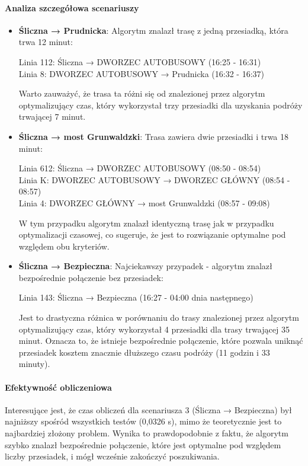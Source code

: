 \documentclass[12pt,a4paper]{article}
\begin{document}
\paragraph{Analiza szczegółowa scenariuszy}

\begin{itemize}
    \item \textbf{Śliczna → Prudnicka}: Algorytm znalazł trasę z jedną przesiadką, która trwa 12 minut:
    \begin{center}
    Linia 112: Śliczna → DWORZEC AUTOBUSOWY (16:25 - 16:31) \\
    Linia 8: DWORZEC AUTOBUSOWY → Prudnicka (16:32 - 16:37)
    \end{center}
    
    Warto zauważyć, że trasa ta różni się od znalezionej przez algorytm optymalizujący czas, który wykorzystał trzy przesiadki dla uzyskania podróży trwającej 7 minut. 
    
    \item \textbf{Śliczna → most Grunwaldzki}: Trasa zawiera dwie przesiadki i trwa 18 minut:
    \begin{center}
    Linia 612: Śliczna → DWORZEC AUTOBUSOWY (08:50 - 08:54) \\
    Linia K: DWORZEC AUTOBUSOWY → DWORZEC GŁÓWNY (08:54 - 08:57) \\
    Linia 4: DWORZEC GŁÓWNY → most Grunwaldzki (08:57 - 09:08)
    \end{center}
    
    W tym przypadku algorytm znalazł identyczną trasę jak w przypadku optymalizacji czasowej, co sugeruje, że jest to rozwiązanie optymalne pod względem obu kryteriów.
    
    \item \textbf{Śliczna → Bezpieczna}: Najciekawszy przypadek - algorytm znalazł bezpośrednie połączenie bez przesiadek:
    \begin{center}
    Linia 143: Śliczna → Bezpieczna (16:27 - 04:00 dnia następnego)
    \end{center}
    
    Jest to drastyczna różnica w porównaniu do trasy znalezionej przez algorytm optymalizujący czas, który wykorzystał 4 przesiadki dla trasy trwającej 35 minut. Oznacza to, że istnieje bezpośrednie połączenie, które pozwala uniknąć przesiadek kosztem znacznie dłuższego czasu podróży (11 godzin i 33 minuty).
\end{itemize}

\paragraph{Efektywność obliczeniowa}
Interesujące jest, że czas obliczeń dla scenariusza 3 (Śliczna → Bezpieczna) był najniższy spośród wszystkich testów (0,0326 s), mimo że teoretycznie jest to najbardziej złożony problem. Wynika to prawdopodobnie z faktu, że algorytm szybko znalazł bezpośrednie połączenie, które jest optymalne pod względem liczby przesiadek, i mógł wcześnie zakończyć poszukiwania.
\end{document}
